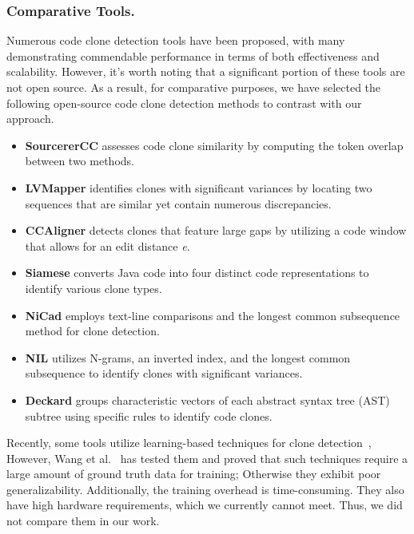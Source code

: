 \subsubsection{Comparative Tools.}
Numerous code clone detection tools have been proposed, with many demonstrating commendable performance in terms of both effectiveness and scalability. 
However, it's worth noting that a significant portion of these tools are not open source. 
As a result, for comparative purposes, we have selected the following open-source code clone detection methods to contrast with our approach.
\begin{itemize}
    \item \textbf{SourcererCC} \cite{sajnani2016sourcerercc}  assesses code clone similarity by computing the token overlap between two methods.
    \item \textbf{LVMapper} \cite{lvmapper2020}  identifies clones with significant variances by locating two sequences that are similar yet contain numerous discrepancies.
    \item \textbf{CCAligner} \cite{wang2018ccaligner} detects clones that feature large gaps by utilizing a code window that allows for an edit distance \emph{e}.
    \item \textbf{Siamese} \cite{Ragkhitwetsagul2019SiameseSA} converts Java code into four distinct code representations to identify various clone types.
    \item \textbf{NiCad} \cite{roy2008nicad} employs text-line comparisons and the longest common subsequence method for clone detection.
    \item \textbf{NIL} \cite{nil2021} utilizes N-grams, an inverted index, and the longest common subsequence to identify clones with significant variances.
    \item \textbf{Deckard} \cite{jiang2007deckard} groups characteristic vectors of each abstract syntax tree (AST) subtree using specific rules to identify code clones.
\end{itemize}

Recently, some tools utilize learning-based techniques for clone detection~\cite{dou2024cc2vec,zhang2019astnn}, However, Wang et al.~\cite{wang2023comparison} has tested them and proved that such techniques require a large amount of ground truth data for training; Otherwise they exhibit poor generalizability. Additionally, the training overhead is time-consuming. They also have high hardware requirements, which we currently cannot meet. Thus, we did not compare them in our work.

